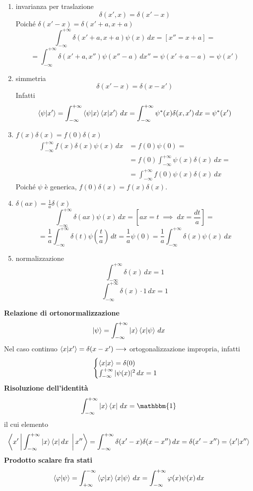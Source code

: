 \begin{enumerate}
\item invarianza per traslazione
\[
\delta(x', x) = \delta(x' - x)
\]
Poiché \(\delta(x' - x) = \delta(x' + a, x + a)\)
\[
\int_{-\infty}^{+\infty} \delta(x' + a, x + a) \psi(x) \, dx = [x'' = x + a] =
\]
\[
= \int_{-\infty}^{+\infty} \delta(x' + a, x'') \psi(x'' - a) \, dx'' = \psi(x' + a - a) = \psi(x')
\]
\item simmetria
\[
\delta(x' - x)  = \delta(x - x')
\]
Infatti
\[
\braket{\psi|x'} = \int_{-\infty}^{+\infty} \braket{\psi|x}\braket{x|x'} \, dx = \int_{-\infty}^{+\infty} \psi^*(x) \delta(x,x') \, dx = \psi^*(x')
\]
\item \(f(x) \delta(x) = f(0) \delta(x)\)
\begin{align*}
\int_{-\infty}^{+\infty} f(x) \delta(x) \psi(x) \, dx &= f(0) \psi(0) = \\
&= f(0) \int_{-\infty}^{+\infty} \psi(x) \delta(x) \, dx = \\
&= \int_{-\infty}^{+\infty} f(0) \psi(x) \delta(x) \, dx
\end{align*}
Poiché \(\psi\) è generica, \(f(0) \delta(x) = f(x) \delta(x)\).
\item \(\delta(ax) = \frac{1}{a} \delta(x)\)
\[
\int_{-\infty}^{+\infty} \delta(ax) \psi(x) \, dx = \left[ ax = t \; \implies \; dx = \frac{dt}{a} \right] = 
\]
\[
= \frac{1}{a} \int_{-\infty}^{+\infty} \delta(t) \psi \left( \frac{t}{a} \right) \, dt = \frac{1}{a} \psi(0) = \frac{1}{a} \int_{-\infty}^{+\infty} \delta(x) \psi(x) \, dx 
\]
\item normalizzazione
\[
\int_{-\infty}^{+\infty} \delta(x) \, dx = 1
\]
\[
\int_{-\infty}^{+\infty} \delta(x) \cdot 1 \, dx = 1
\]
\end{enumerate}
\textbf{Relazione di ortonormalizzazione}
\[
\ket{\psi} = \int_{-\infty}^{+\infty} \ket{x}\braket{x|\psi} \, dx
\]
Nel caso continuo \(\braket{x|x'} = \delta(x - x') \longrightarrow\) ortogonalizzazione impropria, infatti
\[
\begin{cases}
\braket{x|x} = \delta(0) \\
\int_{-\infty}^{+\infty} |\psi(x)|^2 \, dx = 1
\end{cases}
\]
\textbf{Risoluzione dell'identità}
\[
\int_{-\infty}^{+\infty} \ket{x} \bra{x} \, dx = \mathbbm{1}
\]
il cui elemento
\[
\Braket{x'|\int_{-\infty}^{+\infty} \Ket{x} \Bra{x} dx\;|x''} = \int_{-\infty}^{+\infty} \delta(x' - x) \delta(x - x'') \, dx = \delta(x' - x'') = \braket{x'|x''}
\]
\textbf{Prodotto scalare fra stati}
\[
\braket{\varphi|\psi} = \int_{+\infty}^{-\infty} \braket{\varphi|x}\braket{x|\psi} \, dx = \int_{-\infty}^{+\infty} \varphi(x) \psi(x) \, dx
\]
